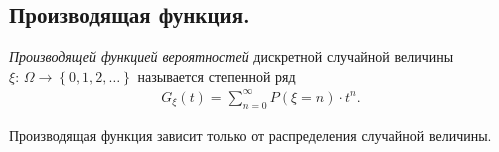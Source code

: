 \documentclass[../main.tex]{subfiles}
\begin{document}
\subsection{Производящая функция.}

\begin{df}
 \textit{Производящей функцией вероятностей} дискретной случайной величины $ \xi\colon\,\Omega\to \left\{ 0,1,2,\ldots \right\} $ называется степенной ряд
 \begin{align*}
  G_\xi(t) = \sum_{n=0}^{\infty}P(\xi = n) \cdot t^{n}.
 \end{align*}
\end{df}

\begin{remrk*}
 Производящая функция зависит только от распределения случайной величины. 
\end{remrk*}
\end{document}
